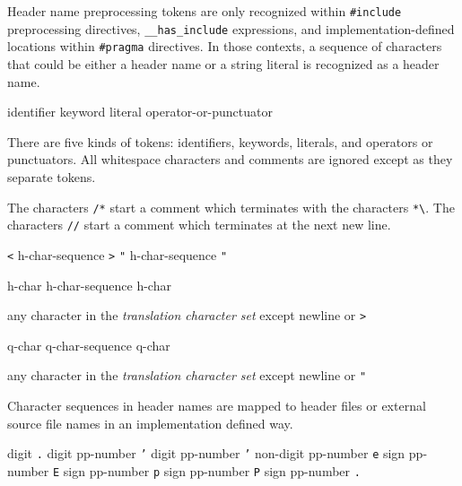 \p Header name preprocessing tokens are only recognized within
\texttt{\#include} preprocessing directives, \texttt{\_\_has\_include} expressions,
and implementation-defined locations within \texttt{\#pragma} directives. In
those contexts, a sequence of characters that could be either a header name or a
string literal is recognized as a header name.


\begin{grammar}
  \br
  identifier\br
  keyword\br
  literal\br
  operator-or-punctuator
\end{grammar}

\p There are five kinds of tokens: identifiers, keywords, literals, and
operators or punctuators. All whitespace characters and comments are ignored
except as they separate tokens.


\p The characters \texttt{/*} start a comment which terminates with the
characters \texttt{*\textbackslash}. The characters \texttt{//} start a comment
which terminates at the next new line.


\begin{grammar}
  \br
  \texttt{<} h-char-sequence \texttt{>}\br
  \texttt{"} h-char-sequence \texttt{"}

  \br
  h-char\br
  h-char-sequence h-char

  \br
  \textnormal{any character in the \textit{translation character set} except
  newline or \texttt{>}}

  \br
  q-char\br
  q-char-sequence q-char

  \br
  \textnormal{any character in the \textit{translation character set} except
  newline or \texttt{"}}
\end{grammar}

\p Character sequences in header names are mapped to header files or external
source file names in an implementation defined way.


\begin{grammar}
  \br
  digit\br
  \texttt{.} digit\br
  pp-number \texttt{'} digit\br
  pp-number \texttt{'} non-digit\br
  pp-number \texttt{e} sign\br
  pp-number \texttt{E} sign\br
  pp-number \texttt{p} sign\br
  pp-number \texttt{P} sign\br
  pp-number \texttt{.}
\end{grammar}

